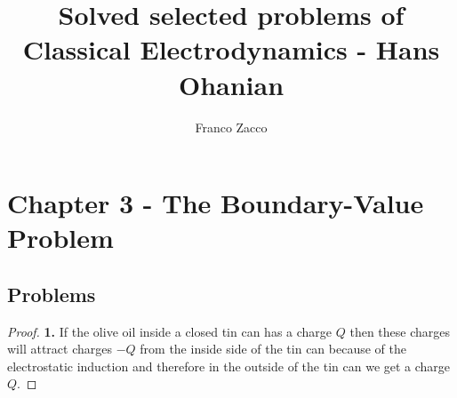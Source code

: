 \documentclass[11pt]{article}
\title{\textbf{Solved selected problems of Classical Electrodynamics - Hans Ohanian}}
\author{Franco Zacco}
\date{}
\theoremstyle{definition}
\begin{document}
\maketitle
\thispagestyle{empty}

\section*{Chapter 3 - The Boundary-Value Problem}

\subsection*{Problems}
\begin{proof}{\textbf{1.}}
    If the olive oil inside a closed tin can has a charge $Q$ then these charges
    will attract charges $-Q$ from the inside side of the tin can because of 
    the electrostatic induction and therefore in the outside of the tin can we
    get a charge $Q$.
\end{proof}
\end{document}
